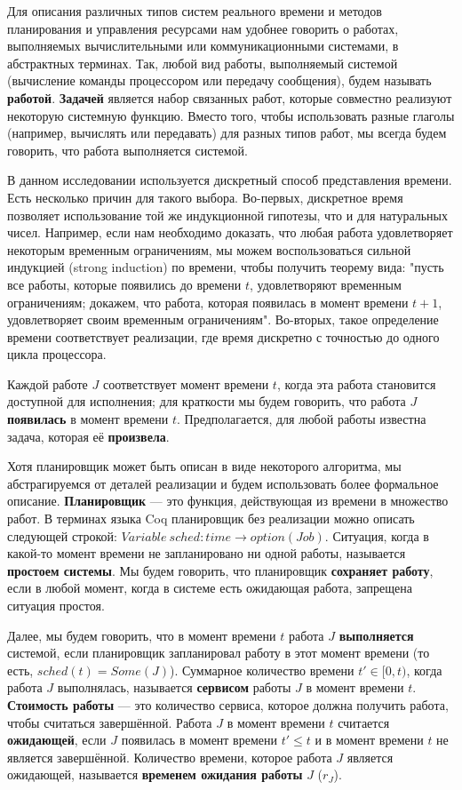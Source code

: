 Для описания различных типов систем реального времени и методов планирования и управления
  ресурсами нам удобнее говорить о работах, выполняемых вычислительными
  или коммуникационными системами, в абстрактных терминах. Так, любой вид работы,
  выполняемый системой (вычисление команды процессором или передачу сообщения),
  будем называть \textbf{работой}. \textbf{Задачей} является набор связанных работ, которые совместно
  реализуют некоторую системную функцию. Вместо того, чтобы использовать разные
  глаголы (например, вычислять или передавать) для разных типов работ, мы всегда
  будем говорить, что работа выполняется системой.

В данном исследовании используется дискретный способ представления времени.
  Есть несколько причин для такого выбора. Во-первых, дискретное
  время позволяет использование той же индукционной гипотезы, что и для натуральных чисел.
  Например, если нам необходимо
  доказать, что любая работа удовлетворяет некоторым временным ограничениям, мы можем
  воспользоваться сильной индукцией (strong induction) по времени, чтобы получить теорему вида: "пусть все работы,
  которые появились до времени $t$, удовлетворяют временным ограничениям;
  докажем, что работа, которая появилась в момент времени $t + 1$, удовлетворяет
  своим временным ограничениям". Во-вторых, такое определение времени соответствует
  реализации, где время дискретно с точностью до одного цикла процессора.

Каждой работе $J$ соответствует момент времени $t$, когда эта работа становится
  доступной для исполнения; для краткости мы будем говорить, что работа $J$
  \textbf{появилась} в момент времени $t$. Предполагается, для любой работы известна задача,
  которая её \textbf{произвела}.

Хотя планировщик может быть описан в виде некоторого алгоритма, мы абстрагируемся от
  деталей реализации и будем использовать более формальное описание. \textbf{Планировщик}
  --- это функция, действующая из времени в множество работ. В терминах языка Coq
  планировщик без реализации можно описать следующей строкой: $Variable \ sched: time
  \rightarrow option (Job)$. Ситуация, когда в какой-то момент времени не запланировано
  ни одной работы, называется \textbf{простоем системы}. Мы будем говорить, что планировщик
  \textbf{сохраняет работу}, если в любой момент, когда в системе есть
  ожидающая работа, запрещена ситуация простоя.

Далее, мы будем говорить, что в момент времени $t$ работа $J$ \textbf{выполняется} системой,
  если планировщик запланировал работу в этот момент времени (то есть, $sched(t) = Some(J)$).
  Суммарное количество времени $t' \in [0, t)$, когда работа $J$ выполнялась,
  называется \textbf{сервисом} работы $J$ в момент времени $t$.
  \textbf{Стоимость работы} --- это количество сервиса, которое должна получить работа,
  чтобы считаться завершённой. Работа $J$ в момент времени $t$ считается \textbf{ожидающей},
  если $J$ появилась в момент времени $t' \leq t$ и в момент времени $t$ не является завершённой.
  Количество времени, которое работа $J$ является ожидающей, называется \textbf{временем ожидания работы} $J$ ($r_J$).


